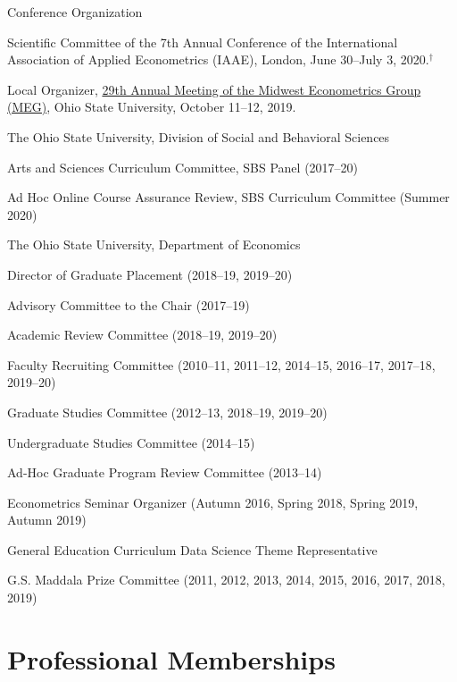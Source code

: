 \documentclass[10pt,letterpaper]{article}
\renewenvironment{itemize}{
  \begin{list}{}{
      \setlength{\leftmargin}{1.5em}
      \setlength{\itemsep}{0.25em}
      \setlength{\parskip}{0pt}
      \setlength{\parsep}{0.25em}
    }
}{
  \end{list}
}
\newcommand{\fncovid}{{\footnotesize ${}^{\dagger}$}}
\begin{document}
\begin{itemize}
\item Conference Organization
  \begin{itemize}
  \item Scientific Committee of the 7th Annual Conference of the International Association of Applied Econometrics (IAAE), London, June 30--July 3, 2020.\fncovid
  \item Local Organizer, \href{https://jblevins.org/pub/meg-2019.pdf}{29th Annual Meeting of the Midwest Econometrics Group (MEG)}, Ohio State University, October 11--12, 2019.
  \end{itemize}
\item The Ohio State University, Division of Social and Behavioral Sciences
  \begin{itemize}
  \item Arts and Sciences Curriculum Committee, SBS Panel (2017--20)
  \item Ad Hoc Online Course Assurance Review, SBS Curriculum Committee (Summer 2020)
  \end{itemize}
\item The Ohio State University, Department of Economics
  \begin{itemize}
  \item Director of Graduate Placement (2018--19, 2019--20)
  \item Advisory Committee to the Chair (2017--19)
  \item Academic Review Committee (2018--19, 2019--20)
  \item Faculty Recruiting Committee (2010--11, 2011--12, 2014--15, 2016--17, 2017--18, 2019--20)
  \item Graduate Studies Committee (2012--13, 2018--19, 2019--20)
  \item Undergraduate Studies Committee (2014--15)
  \item Ad-Hoc Graduate Program Review Committee (2013--14)
  \item Econometrics Seminar Organizer (Autumn 2016, Spring 2018, Spring 2019, Autumn 2019)
  \item General Education Curriculum Data Science Theme Representative
  \item G.S. Maddala Prize Committee (2011, 2012, 2013, 2014, 2015, 2016, 2017, 2018, 2019)
  \end{itemize}
\end{itemize}

\section*{Professional Memberships}
\end{document}
